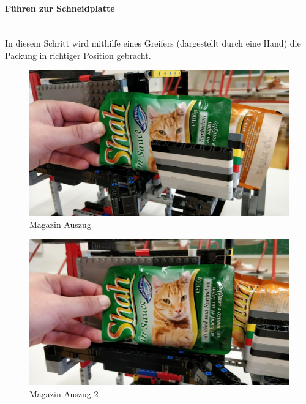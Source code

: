 \documentclass[a4paper,12pt]{scrartcl}
\begin{document}
\newpage 

\paragraph{Führen zur Schneidplatte}$~~$\\  

In diesem Schritt wird mithilfe eines Greifers (dargestellt durch eine Hand) die Packung in richtiger Position gebracht.

\begin{figure}[H]
\begin{center}
\includegraphics[width=13cm]{Bilder/Ablauf_1_png/Magazin_Auszug.jpeg}
\caption{Magazin Auszug}
\end{center}
\end{figure}

\begin{figure}[H]
\begin{center}
\includegraphics[width=13cm]{Bilder/Ablauf_1_png/Magazin_Auszug_2.jpeg}
\caption{Magazin Auszug 2}
\end{center}
\end{figure}
\end{document}

